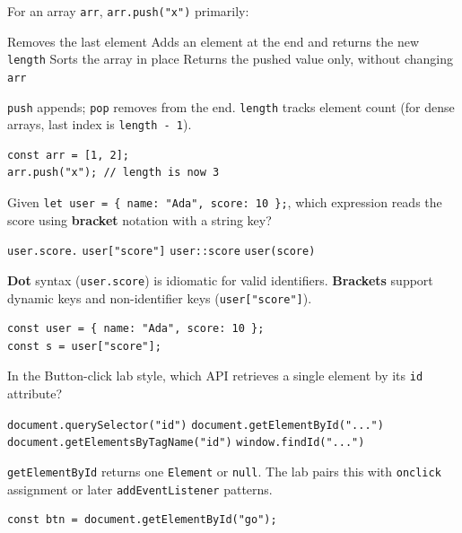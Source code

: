 \question[4]
For an array \texttt{arr}, \texttt{arr.push("x")} primarily:
\begin{choices}
  \choice Removes the last element
  \CorrectChoice Adds an element at the end and returns the new \texttt{length}
  \choice Sorts the array in place
  \choice Returns the pushed value only, without changing \texttt{arr}
\end{choices}
\begin{solution}
  \texttt{push} appends; \texttt{pop} removes from the end. \texttt{length} tracks element count (for dense arrays, last index is \texttt{length - 1}).
\begin{lstlisting}[style=jsexam]
const arr = [1, 2];
arr.push("x"); // length is now 3
\end{lstlisting}
\end{solution}

\question[4]
Given \texttt{let user = \{ name: "Ada", score: 10 \};}, which expression reads the score using \textbf{bracket} notation with a string key?
\begin{choices}
  \choice \texttt{user.score.}
  \CorrectChoice \texttt{user["score"]}
  \choice \texttt{user::score}
  \choice \texttt{user(score)}
\end{choices}
\begin{solution}
  \textbf{Dot} syntax (\texttt{user.score}) is idiomatic for valid identifiers. \textbf{Brackets} support dynamic keys and non-identifier keys (\texttt{user["score"]}).
\begin{lstlisting}[style=jsexam]
const user = { name: "Ada", score: 10 };
const s = user["score"];
\end{lstlisting}
\end{solution}

\question[4]
In the Button-click lab style, which API retrieves a single element by its \texttt{id} attribute?
\begin{choices}
  \choice \texttt{document.querySelector("id")}
  \CorrectChoice \texttt{document.getElementById("...")}
  \choice \texttt{document.getElementsByTagName("id")}
  \choice \texttt{window.findId("...")}
\end{choices}
\begin{solution}
  \texttt{getElementById} returns one \texttt{Element} or \texttt{null}. The lab pairs this with \texttt{onclick} assignment or later \texttt{addEventListener} patterns.
\begin{lstlisting}[style=jsexam]
const btn = document.getElementById("go");
\end{lstlisting}
\end{solution}

